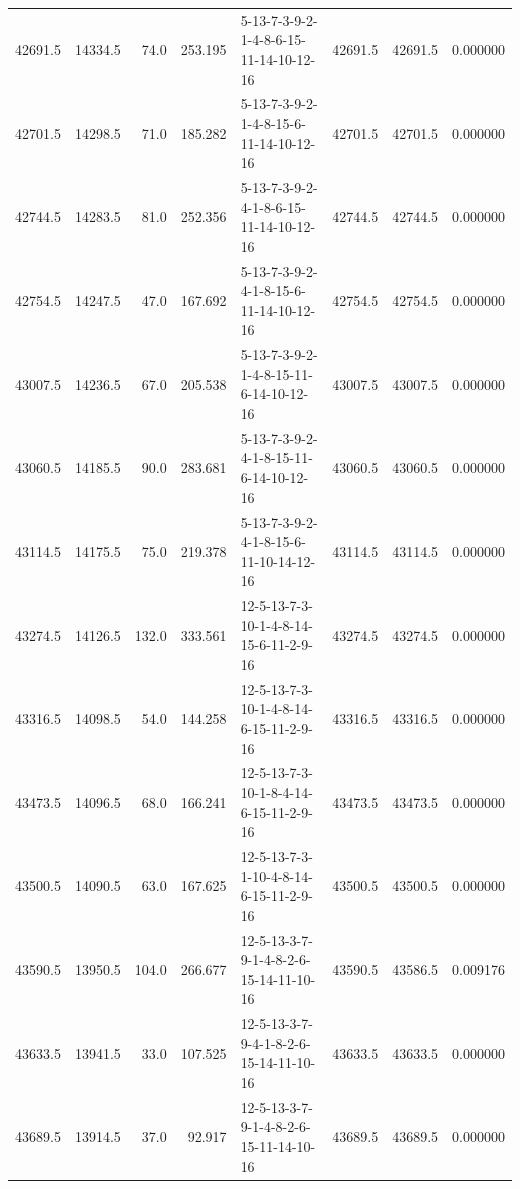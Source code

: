 \begin{tabular}{rrrrlrrr}
 42691.5 &  14334.5 &           74.0 &            253.195 &  5-13-7-3-9-2-1-4-8-6-15-11-14-10-12-16 &       42691.5 &         42691.5 &  0.000000 \\
 42701.5 &  14298.5 &           71.0 &            185.282 &  5-13-7-3-9-2-1-4-8-15-6-11-14-10-12-16 &       42701.5 &         42701.5 &  0.000000 \\
 42744.5 &  14283.5 &           81.0 &            252.356 &  5-13-7-3-9-2-4-1-8-6-15-11-14-10-12-16 &       42744.5 &         42744.5 &  0.000000 \\
 42754.5 &  14247.5 &           47.0 &            167.692 &  5-13-7-3-9-2-4-1-8-15-6-11-14-10-12-16 &       42754.5 &         42754.5 &  0.000000 \\
 43007.5 &  14236.5 &           67.0 &            205.538 &  5-13-7-3-9-2-1-4-8-15-11-6-14-10-12-16 &       43007.5 &         43007.5 &  0.000000 \\
 43060.5 &  14185.5 &           90.0 &            283.681 &  5-13-7-3-9-2-4-1-8-15-11-6-14-10-12-16 &       43060.5 &         43060.5 &  0.000000 \\
 43114.5 &  14175.5 &           75.0 &            219.378 &  5-13-7-3-9-2-4-1-8-15-6-11-10-14-12-16 &       43114.5 &         43114.5 &  0.000000 \\
 43274.5 &  14126.5 &          132.0 &            333.561 &  12-5-13-7-3-10-1-4-8-14-15-6-11-2-9-16 &       43274.5 &         43274.5 &  0.000000 \\
 43316.5 &  14098.5 &           54.0 &            144.258 &  12-5-13-7-3-10-1-4-8-14-6-15-11-2-9-16 &       43316.5 &         43316.5 &  0.000000 \\
 43473.5 &  14096.5 &           68.0 &            166.241 &  12-5-13-7-3-10-1-8-4-14-6-15-11-2-9-16 &       43473.5 &         43473.5 &  0.000000 \\
 43500.5 &  14090.5 &           63.0 &            167.625 &  12-5-13-7-3-1-10-4-8-14-6-15-11-2-9-16 &       43500.5 &         43500.5 &  0.000000 \\
 43590.5 &  13950.5 &          104.0 &            266.677 &  12-5-13-3-7-9-1-4-8-2-6-15-14-11-10-16 &       43590.5 &         43586.5 &  0.009176 \\
 43633.5 &  13941.5 &           33.0 &            107.525 &  12-5-13-3-7-9-4-1-8-2-6-15-14-11-10-16 &       43633.5 &         43633.5 &  0.000000 \\
 43689.5 &  13914.5 &           37.0 &             92.917 &  12-5-13-3-7-9-1-4-8-2-6-15-11-14-10-16 &       43689.5 &         43689.5 &  0.000000 \\

\end{tabular}
